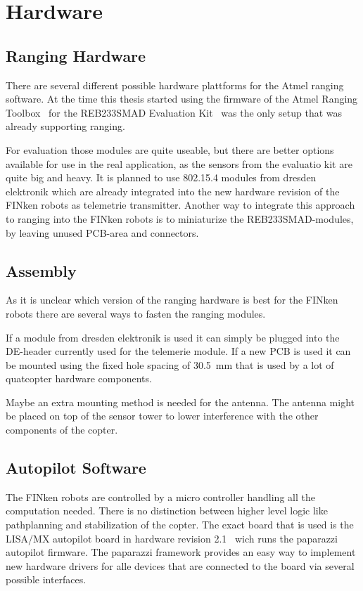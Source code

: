 
\section{Hardware}

\subsection{Ranging Hardware}

There are several different possible hardware plattforms for the Atmel ranging software.
At the time this thesis started using the firmware of the Atmel Ranging Toolbox~\cite{atmelrtb} for the REB233SMAD Evaluation Kit~\cite{REB233SMAD} was the only setup that was already supporting ranging.

For evaluation those modules are quite useable, but there are better options available for use in the real application, as the sensors from the evaluatio kit are quite big and heavy.
It is planned to use 802.15.4 modules from dresden elektronik which are already integrated into the new hardware revision of the FINken robots as telemetrie transmitter.
Another way to integrate this approach to ranging into the FINken robots is to miniaturize the REB233SMAD-modules, by leaving unused PCB-area and connectors.

\subsection{Assembly}

As it is unclear which version of the ranging hardware is best for the FINken robots there are several ways to fasten the ranging modules.

If a module from dresden elektronik is used it can simply be plugged into the DE-header currently used for the telemerie module.
If a new PCB is used it can be mounted using the fixed hole spacing of \SI{30.5}{mm} that is used by a lot of quatcopter hardware components.

Maybe an extra mounting method is needed for the antenna.
The antenna might be placed on top of the sensor tower to lower interference with the other components of the copter.

\subsection{Autopilot Software}
The FINken robots are controlled by a micro controller handling all the computation needed.
There is no distinction between higher level logic like pathplanning and stabilization of the copter.
The exact board that is used is the LISA/MX autopilot board in hardware revision 2.1~\cite{lisamx} wich runs the paparazzi autopilot firmware\cite{paparazzi}.
The paparazzi framework provides an easy way to implement new hardware drivers for alle devices that are connected to the board via several possible interfaces.

